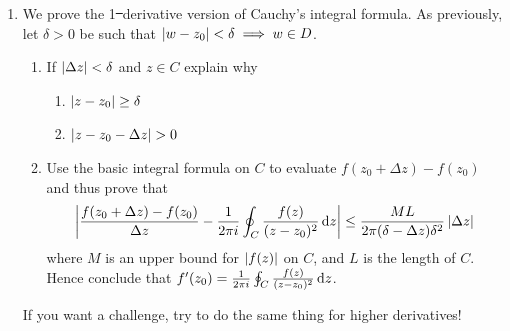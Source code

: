 \begin{exercises*}
\begin{enumerate}
	  
		\item\label{exs:cauchyintgeneral} We prove the 1\st\ derivative version of Cauchy's integral formula. As previously, let $\delta>0$ be such that $\left| w-z_0\right|<\delta\implies w\in D$.
		\begin{enumerate}
		  \item If $\left| \Delta z\right|<\delta$ and $z\in C$ explain why
		  \begin{enumerate}
		    \item $\left| z-z_0\right|\ge \delta$
		    \item $\nm{z-z_0-\Delta z}>0$ 
		  \end{enumerate}
		  \item Use the basic integral formula on $C$ to evaluate $f(z_0+\Delta z)-f(z_0)$ and thus prove that
		  \[
		  	\left| \frac{f(z_0+\Delta z)-f(z_0)}{\Delta z}-\frac 1{2\pi i}\oint_C\frac{f(z)}{(z-z_0)^2}\,{\mathrm{d} z}\right| \le \frac{ML}{2\pi(\delta-\Delta z)\delta^2}\left| \Delta z\right|
		  \]
		  where $M$ is an upper bound for $\left| f(z)\right|$ on $C$, and $L$ is the length of $C$. Hence conclude that $f'(z_0)=\frac 1{2\pi i}\oint_C\frac{f(z)}{(z-z_0)^2}\,{\mathrm{d} z}$.
		\end{enumerate}
		If you want a challenge, try to do the same thing for higher derivatives!
		
		
		  
	\end{enumerate}
\end{exercises*}
  

